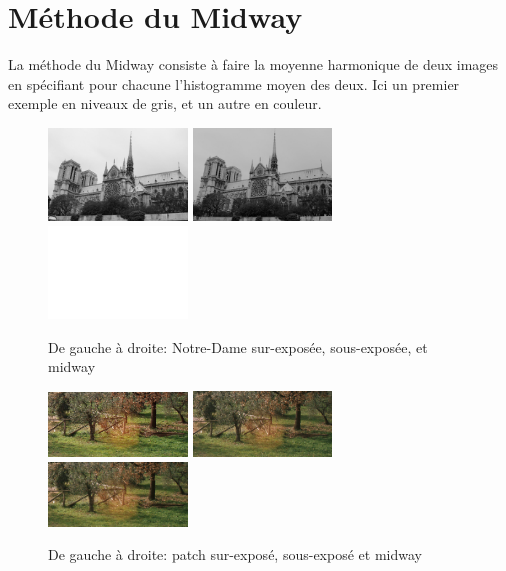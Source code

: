 \documentclass{article}
\begin{document}
\begin{figure}[h]
  \caption{}
\end{figure}


\section{Méthode du Midway}
La méthode du Midway consiste à faire la moyenne harmonique de deux images en spécifiant pour chacune l'histogramme moyen des deux. Ici un premier exemple en niveaux de gris, et un autre en couleur.

\begin{figure}[h]
	\includegraphics[width=0.33\textwidth]{NotreDame1.png}
	\includegraphics[width=0.33\textwidth]{NotreDame2.png}
	\includegraphics[width=0.33\textwidth]{NotreDame1M.png}
  \caption{De gauche à droite: Notre-Dame sur-exposée, sous-exposée, et midway}
\end{figure}

\begin{figure}[h]
	\includegraphics[width=0.33\textwidth]{P1c.jpg}
	\includegraphics[width=0.33\textwidth]{P2c.jpg}
	\includegraphics[width=0.33\textwidth]{P1Mc.png}
  \caption{De gauche à droite: patch sur-exposé, sous-exposé et midway}
\end{figure}
\end{document}
